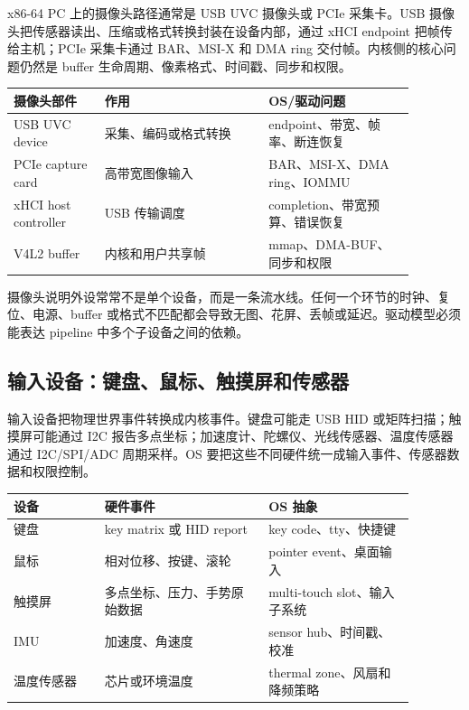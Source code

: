 x86-64 PC 上的摄像头路径通常是 USB UVC 摄像头或 PCIe 采集卡。USB 摄像头把传感器读出、压缩或格式转换封装在设备内部，通过 xHCI endpoint 把帧传给主机；PCIe 采集卡通过 BAR、MSI-X 和 DMA ring 交付帧。内核侧的核心问题仍然是 buffer 生命周期、像素格式、时间戳、同步和权限。

\begin{longtable}{p{0.2\linewidth}p{0.36\linewidth}p{0.32\linewidth}}
\toprule
摄像头部件 & 作用 & OS/驱动问题 \\
\midrule
USB UVC device & 采集、编码或格式转换 & endpoint、带宽、帧率、断连恢复 \\
PCIe capture card & 高带宽图像输入 & BAR、MSI-X、DMA ring、IOMMU \\
xHCI host controller & USB 传输调度 & completion、带宽预算、错误恢复 \\
V4L2 buffer & 内核和用户共享帧 & mmap、DMA-BUF、同步和权限 \\
\bottomrule
\end{longtable}

摄像头说明外设常常不是单个设备，而是一条流水线。任何一个环节的时钟、复位、电源、buffer 或格式不匹配都会导致无图、花屏、丢帧或延迟。驱动模型必须能表达 pipeline 中多个子设备之间的依赖。

\subsection{输入设备：键盘、鼠标、触摸屏和传感器}

输入设备把物理世界事件转换成内核事件。键盘可能走 USB HID 或矩阵扫描；触摸屏可能通过 I2C 报告多点坐标；加速度计、陀螺仪、光线传感器、温度传感器通过 I2C/SPI/ADC 周期采样。OS 要把这些不同硬件统一成输入事件、传感器数据和权限控制。

\begin{longtable}{p{0.2\linewidth}p{0.36\linewidth}p{0.32\linewidth}}
\toprule
设备 & 硬件事件 & OS 抽象 \\
\midrule
键盘 & key matrix 或 HID report & key code、tty、快捷键 \\
鼠标 & 相对位移、按键、滚轮 & pointer event、桌面输入 \\
触摸屏 & 多点坐标、压力、手势原始数据 & multi-touch slot、输入子系统 \\
IMU & 加速度、角速度 & sensor hub、时间戳、校准 \\
温度传感器 & 芯片或环境温度 & thermal zone、风扇和降频策略 \\
\bottomrule
\end{longtable}

